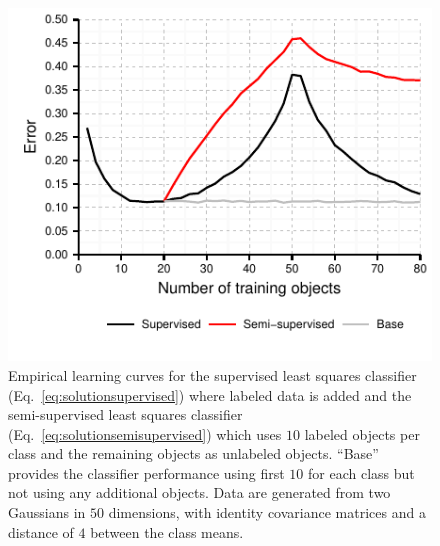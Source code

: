 \documentclass[runningheads,a4paper]{llncs}\usepackage[]{graphicx}\usepackage[]{color}
\makeatletter
\def\maxwidth{ %
  \ifdim\Gin@nat@width>\linewidth
    \linewidth
  \else
    \Gin@nat@width
  \fi
}
\newenvironment{knitrout}{}{} %
\makeatother
\begin{document}
\begin{knitrout}
\color{fgcolor}\begin{figure}

{\centering \includegraphics[width=\maxwidth]{figure/peaking-1} 

}

\caption{Empirical learning curves for the supervised least squares classifier (Eq.~\eqref{eq:solutionsupervised}) where labeled data is added and the semi-supervised least squares classifier (Eq.~\eqref{eq:solutionsemisupervised}) which uses $10$ labeled objects per class and the remaining objects as unlabeled objects. ``Base'' provides the classifier performance using first $10$ for each class but not using any additional objects. Data are generated from two Gaussians in $50$ dimensions, with identity covariance matrices and a distance of $4$ between the class means.}\label{fig:peaking}
\end{figure}


\end{knitrout}
\end{document}
